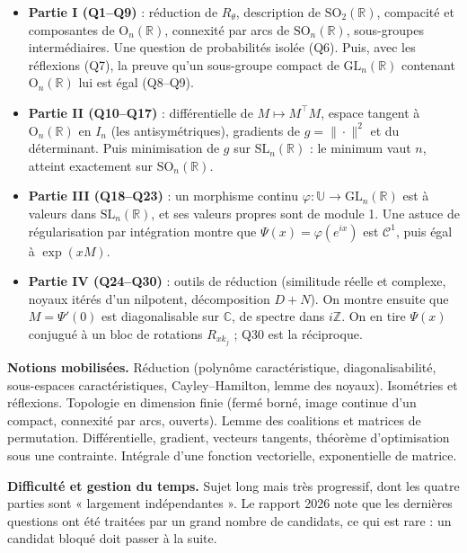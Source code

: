 \documentclass[11pt,a4paper]{article}
\providecommand{\tightlist}{\setlength{\itemsep}{0pt}\setlength{\parskip}{0pt}}
\begin{document}
\begin{itemize}
\tightlist
\item
  \textbf{Partie I (Q1--Q9)} : réduction de \(R_\theta\), description de \({\mathrm{SO}}_2(\mathbb R)\), compacité et composantes de \({\mathrm{O}}_n(\mathbb R)\), connexité par arcs de \({\mathrm{SO}}_n(\mathbb R)\), sous-groupes intermédiaires. Une question de probabilités isolée (Q6). Puis, avec les réflexions (Q7), la preuve qu'un sous-groupe compact de \({\mathrm{GL}}_n(\mathbb R)\) contenant \({\mathrm{O}}_n(\mathbb R)\) lui est égal (Q8--Q9).
\item
  \textbf{Partie II (Q10--Q17)} : différentielle de \(M\mapsto M^\top M\), espace tangent à \({\mathrm{O}}_n(\mathbb R)\) en \(I_n\) (les antisymétriques), gradients de \(g=\|\cdot\|^2\) et du déterminant.
  Puis minimisation de \(g\) sur \({\mathrm{SL}}_n(\mathbb R)\) : le minimum vaut \(n\), atteint exactement sur \({\mathrm{SO}}_n(\mathbb R)\).
\item
  \textbf{Partie III (Q18--Q23)} : un morphisme continu \(\varphi:\mathbb U\to{\mathrm{GL}}_n(\mathbb R)\) est à valeurs dans \({\mathrm{SL}}_n(\mathbb R)\), et ses valeurs propres sont de module 1. Une astuce de régularisation par intégration montre que \(\Psi(x)=\varphi(e^{ix})\) est \(\mathcal C^1\), puis égal à \(\exp(xM)\).
\item
  \textbf{Partie IV (Q24--Q30)} : outils de réduction (similitude réelle et complexe, noyaux itérés d'un nilpotent, décomposition \(D+N\)). On montre ensuite que \(M=\Psi'(0)\) est diagonalisable sur \(\mathbb C\), de spectre dans \(i\mathbb Z\). On en tire \(\Psi(x)\) conjugué à un bloc de rotations \(R_{xk_j}\) ; Q30 est la réciproque.
\end{itemize}

\textbf{Notions mobilisées.} Réduction (polynôme caractéristique, diagonalisabilité, sous-espaces caractéristiques, Cayley--Hamilton, lemme des noyaux). Isométries et réflexions. Topologie en dimension finie (fermé borné, image continue d'un compact, connexité par arcs, ouverts). Lemme des coalitions et matrices de permutation. Différentielle, gradient, vecteurs tangents, théorème d'optimisation sous une contrainte. Intégrale d'une fonction vectorielle, exponentielle de matrice.

\textbf{Difficulté et gestion du temps.} Sujet long mais très progressif, dont les quatre parties sont « largement indépendantes ». Le rapport 2026 note que les dernières questions ont été traitées par un grand nombre de candidats, ce qui est rare : un candidat bloqué doit passer à la suite.
\end{document}
